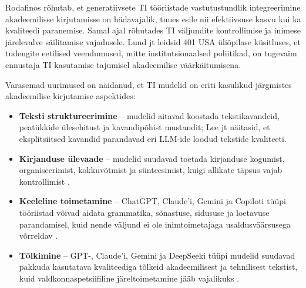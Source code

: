 Rodafinos \cite{rodafinos2025integration} rõhutab, et generatiivsete TI tööriistade vastutustundlik integreerimine akadeemilisse kirjutamisse on hädavajalik, tuues esile nii efektiivsuse kasvu kui ka kvaliteedi paranemise. Samal ajal rõhutades TI väljundite kontrollimise ja inimese järelevalve säilitamise vajadusele. Lund jt \cite{lund2025perceptions} leidsid 401 USA üliõpilase küsitluses, et tudengite eetilised veendumused, mitte institutsionaalsed poliitikad, on tugevaim ennustaja TI kasutamise tajumisel akadeemilise väärkäitumisena.

Varasemad uurimused on näidanud, et TI mudelid on eriti kasulikud järgmistes akadeemilise kirjutamise aspektides:
\begin{itemize}
    \item \textbf{Teksti struktureerimine} -- mudelid aitavad koostada tekstikavandeid, peatükkide ülesehitust ja kavandipõhist mustandit; Lee jt \cite{lee2025navigating} näitasid, et eksplitsiitsed kavandid parandavad eri LLM-ide loodud tekstide kvaliteeti.
    \item \textbf{Kirjanduse ülevaade} -- mudelid suudavad toetada kirjanduse kogumist, organiseerimist, kokkuvõtmist ja sünteesimist, kuigi allikate täpsus vajab kontrollimist \cite{tang2025large, usher2025prompt}.
    \item \textbf{Keeleline toimetamine} -- ChatGPT, Claude'i, Gemini ja Copiloti tüüpi tööriistad võivad aidata grammatika, sõnastuse, sidususe ja loetavuse parandamisel, kuid nende väljund ei ole inimtoimetajaga usaldusväärsusega võrreldav \cite{nadra2026genai}.
    \item \textbf{Tõlkimine} -- GPT-, Claude'i, Gemini ja DeepSeeki tüüpi mudelid suudavad pakkuda kasutatava kvaliteediga tõlkeid akadeemilisest ja tehnilisest tekstist, kuid valdkonnaspetsiifiline järeltoimetamine jääb vajalikuks \cite{pinto2026translation}.
\end{itemize}


